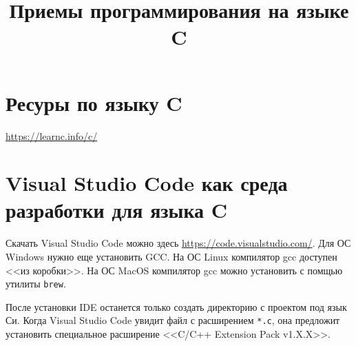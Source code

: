 \documentclass[%
	11pt,
	a4paper,
	utf8,
		]{article}
\begin{document}
\title{Приемы программирования на языке C}

\author{}

\date{}
\maketitle

\thispagestyle{fancy}

\tableofcontents

\section{Ресуры по языку C}

\url{https://learnc.info/c/}

\section{Visual Studio Code как среда разработки для языка C}

Скачать Visual Studio Code можно здесь \url{https://code.visualstudio.com/}. Для ОС Windows нужно еще установить GCC. На ОС Linux компилятор gcc доступен <<из коробки>>. На ОС MacOS компилятор gcc можно установить с помщью утилиты \verb|brew|.

После установки IDE останется только создать директорию с проектом под язык Си. Когда Visual Studio Code увидит файл с расширением \verb|*.c|, она предложит установить специальное расширение <<C/C++ Extension Pack v1.X.X>>.



\begin{thebibliography}{99}
\end{thebibliography}


\lstlistoflistings{}
\end{document}
